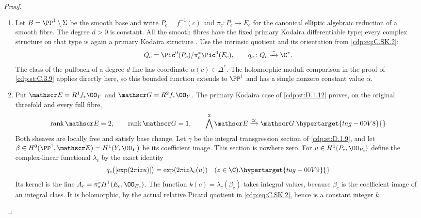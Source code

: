 \begin{proof}

\begin{enumerate}[leftmargin=*]
\item Let $B=\PP^1\setminus\Sigma$ be the smooth base and write
$P_c=f^{-1}(c)$ and $\pi_c:P_c\to E_c$ for the canonical
elliptic algebraic reduction of a smooth fibre. The degree
$d>0$ is constant. All the smooth fibres have the fixed
primary Kodaira differentiable type; every complex structure
on that type is again a primary Kodaira structure
\cite[pp.~373--374]{Borcea1984}.
Use the intrinsic quotient and its orientation from \eqref{cdp:eq:C.SK.2}:
\[
 Q_c=\Pic^0(P_c)/\pi_c^*\Pic^0(E_c),\qquad
 q_c:Q_c\xrightarrow{\simeq}\C^*.
\]
The class of the pullback of a degree-$d$ line has coordinate
$\alpha(c)\in\Delta^*$. The holomorphic moduli comparison
in the proof of \ref{cdp:st:C.3.9} applies directly here, so this bounded
function extends to $\PP^1$ and has a single nonzero
constant value $\alpha$.

\item Put $\mathscr E=R^1f_*\OO_Y$ and
$\mathscr G=R^2f_*\OO_Y$. The primary Kodaira case of
\ref{cdp:st:D.1.12} proves, on the original threefold and every full fibre,
\begin{equation}
 \operatorname{rank}\mathscr E=2,\qquad
 \operatorname{rank}\mathscr G=1,\qquad
 \bigwedge^2\mathscr E\xrightarrow{\simeq}\mathscr G.
\hypertarget{tag-00V8}{}\label{cdp:eq:C.PK.1}
\end{equation}
Both sheaves are locally free and satisfy base change.
Let $\gamma$ be the integral transgression section of \ref{cdp:st:D.1.9},
and let $\beta\in H^0(\PP^1,\mathscr E)=H^1(Y,\OO_Y)$
be its coefficient image. This section is nowhere zero.
For $u\in H^1(P_c,\OO_{P_c})$ define the complex-linear
functional $\lambda_c$ by the exact identity
\begin{equation}
 q_c\bigl([\exp(2\pi\mathrm i z u)]\bigr)
     =\exp(2\pi\mathrm i z\lambda_c(u))
     \quad(z\in\C).
\hypertarget{tag-00V9}{}\label{cdp:eq:C.PK.2}
\end{equation}
Its kernel is the line
$A_c=\pi_c^*H^1(E_c,\OO_{E_c})$.
The function $k(c)=\lambda_c(\beta_c)$ takes integral
values, because $\beta_c$ is the coefficient image of
an integral class. It is holomorphic, by the actual relative
Picard quotient in \eqref{cdp:eq:C.SK.2}, hence is a constant integer $k$.


\end{enumerate}
\end{proof}
